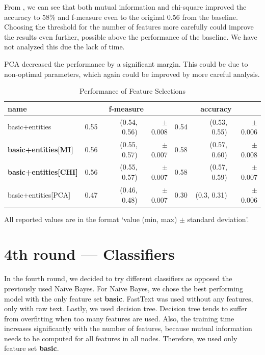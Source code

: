 From , we can see that both mutual information
and chi-square improved the accuracy to 58\% and f-measure even to the original
0.56 from the baseline.
Choosing the threshold for the number of features more carefully could improve the results even further, possible above the performance of the baseline.
We have not analyzed this due the lack of time.

PCA decreased the performance by a significant margin.
This could be due to non-optimal parameters, which
again could be improved by more careful analysis.

\begin{table}[h!]

\centering
\begin{tabular}{lr@{~}r@{~}rr@{~}r@{~}r}
\toprule
\textbf{name}	& \multicolumn{3}{c}{\textbf{f-measure}} & \multicolumn{3}{c}{\textbf{accuracy}} \\

\midrule
basic+entities & 0.55 & (0.54, 0.56) & $\pm$ 0.008 & 0.54 & (0.53, 0.55) & $\pm$ 0.006		\\
\textbf{basic+entities[MI]} & 0.56 & (0.55, 0.57) & $\pm$ 0.007 & 0.58 & (0.57, 0.60) & $\pm$ 0.008 \\
\textbf{basic+entities[CHI]} & 0.56 & (0.55, 0.57) & $\pm$ 0.007 & 0.58 & (0.57, 0.59) & $\pm$ 0.007 \\
basic+entities[PCA] & 0.47 & (0.46, 0.48) & $\pm$ 0.007 & 0.30 & (0.3, 0.31) & $\pm$ 0.006 \\


\bottomrule
\end{tabular}

\caption{Performance of Feature Selections}\label{tab:sel_perf}
All reported values are in the format `value (min, max) $\pm$ standard deviation'.
\end{table}

\section{4th round --- Classifiers}

In the fourth round, we decided to try different classifiers as opposed the previously used Na\"{\i}ve Bayes.
For Na\"{\i}ve Bayes, we chose the best performing model with the only feature set \textbf{basic}.
FastText was used without any features, only with raw text.
Lastly, we used decision tree.
Decision tree tends to suffer from overfitting when too many features are used.
Also, the training time increases significantly with the number of features,
because mutual information needs to be computed for all features in all nodes.
Therefore, we used only feature set \textbf{basic}.

